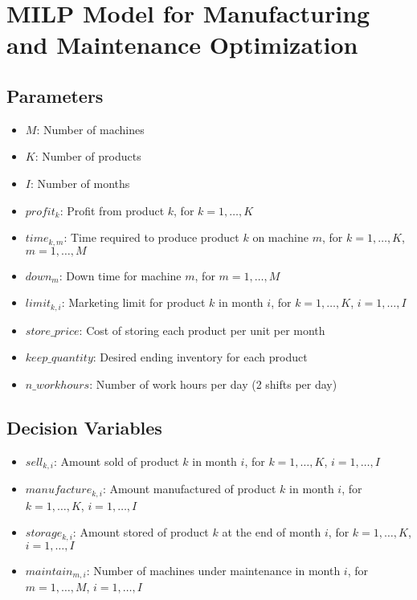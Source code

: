 \documentclass{article}
\begin{document}
\section*{MILP Model for Manufacturing and Maintenance Optimization}

\subsection*{Parameters}
\begin{itemize}
    \item $M$: Number of machines
    \item $K$: Number of products
    \item $I$: Number of months
    \item $profit_{k}$: Profit from product $k$, for $k = 1, \ldots, K$
    \item $time_{k, m}$: Time required to produce product $k$ on machine $m$, for $k = 1, \ldots, K$, $m = 1, \ldots, M$
    \item $down_{m}$: Down time for machine $m$, for $m = 1, \ldots, M$
    \item $limit_{k, i}$: Marketing limit for product $k$ in month $i$, for $k = 1, \ldots, K$, $i = 1, \ldots, I$
    \item $store\_price$: Cost of storing each product per unit per month
    \item $keep\_quantity$: Desired ending inventory for each product
    \item $n\_workhours$: Number of work hours per day (2 shifts per day)
\end{itemize}

\subsection*{Decision Variables}
\begin{itemize}
    \item $sell_{k, i}$: Amount sold of product $k$ in month $i$, for $k = 1, \ldots, K$, $i = 1, \ldots, I$
    \item $manufacture_{k, i}$: Amount manufactured of product $k$ in month $i$, for $k = 1, \ldots, K$, $i = 1, \ldots, I$
    \item $storage_{k, i}$: Amount stored of product $k$ at the end of month $i$, for $k = 1, \ldots, K$, $i = 1, \ldots, I$
    \item $maintain_{m, i}$: Number of machines under maintenance in month $i$, for $m = 1, \ldots, M$, $i = 1, \ldots, I$
\end{itemize}
\end{document}
